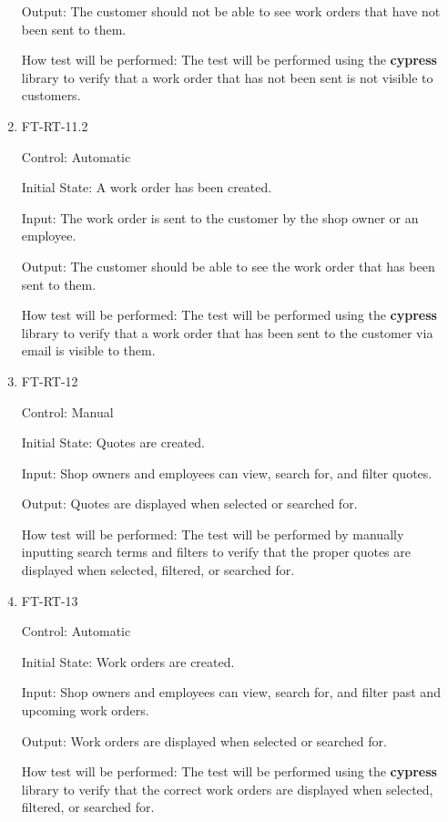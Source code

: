 \documentclass[12pt, titlepage]{article}
\begin{document}
\begin{enumerate}
Output: The customer should not be able to see work orders that have not been sent to them.

How test will be performed: The test will be performed using the \textbf{cypress} library to verify that a work order that has not been sent is not visible to customers.

\item{FT-RT-11.2\\}

Control: Automatic

Initial State: A work order has been created.

Input: The work order is sent to the customer by the shop owner or an employee.

Output: The customer should be able to see the work order that has been sent to them.

How test will be performed: The test will be performed using the \textbf{cypress} library to verify that a work order that has been sent to the customer via email is visible to them.

\item{FT-RT-12\\}

Control: Manual

Initial State: Quotes are created.

Input: Shop owners and employees can view, search for, and filter quotes.

Output: Quotes are displayed when selected or searched for.

How test will be performed: The test will be performed by manually inputting search terms and filters to verify that the proper quotes are displayed when selected, filtered, or searched for.

\item{FT-RT-13\\}

Control: Automatic

Initial State: Work orders are created.

Input: Shop owners and employees can view, search for, and filter past and upcoming work orders.

Output: Work orders are displayed when selected or searched for.

How test will be performed: The test will be performed using the \textbf{cypress} library to verify that the correct work orders are displayed when selected, filtered, or searched for.

\end{enumerate}
\end{document}
